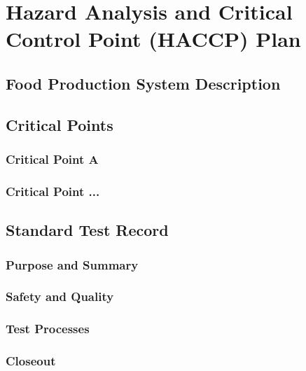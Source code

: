 \section{Hazard Analysis and Critical Control Point (HACCP) Plan}

\subsection{Food Production System Description}

\subsection{Critical Points}

\subsubsection{Critical Point A}

\subsubsection{Critical Point ...}

\subsection{Standard Test Record}

\subsubsection{Purpose and Summary}

\subsubsection{Safety and Quality}

\subsubsection{Test Processes}


\subsubsection{Closeout}